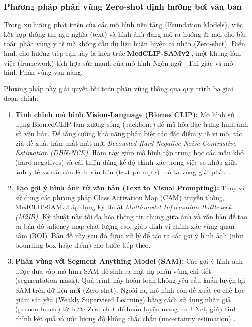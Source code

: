\subsubsection{Phương pháp phân vùng Zero-shot định hướng bởi văn bản}
Trong xu hướng phát triển của các mô hình nền tảng (Foundation Models), việc kết hợp thông tin ngữ nghĩa (text) và hình ảnh đang mở ra hướng đi mới cho bài toán phân vùng y tế mà không cần dữ liệu huấn luyện có nhãn (Zero-shot). Điển hình cho hướng tiếp cận này là kiến trúc \textbf{MedCLIP-SAMv2} \cite{koleilat2025medclipsamv2}, một khung làm việc (framework) tích hợp sức mạnh của mô hình Ngôn ngữ - Thị giác và mô hình Phân vùng vạn năng.

Phương pháp này giải quyết bài toán phân vùng thông qua quy trình ba giai đoạn chính:

\begin{enumerate}
    \item \textbf{Tinh chỉnh mô hình Vision-Language (BiomedCLIP):} 
    Mô hình sử dụng BiomedCLIP làm xương sống (backbone) để mã hóa đặc trưng hình ảnh và văn bản. Để tăng cường khả năng phân biệt các đặc điểm y tế vi mô, tác giả đề xuất hàm mất mát mới \textit{Decoupled Hard Negative Noise Contrastive Estimation (DHN-NCE)}. Hàm này giúp mô hình tập trung học các mẫu khó (hard negatives) và cải thiện đáng kể độ chính xác trong việc so khớp giữa ảnh y tế và các câu lệnh văn bản (text prompts) mô tả vùng giải phẫu \cite{koleilat2025medclipsamv2}.

    \item \textbf{Tạo gợi ý hình ảnh từ văn bản (Text-to-Visual Prompting):} 
    Thay vì sử dụng các phương pháp Class Activation Map (CAM) truyền thống, MedCLIP-SAMv2 áp dụng kỹ thuật \textit{Multi-modal Information Bottleneck (M2IB)}. Kỹ thuật này tối đa hóa thông tin chung giữa ảnh và văn bản để tạo ra bản đồ saliency map chất lượng cao, giúp định vị chính xác vùng quan tâm (ROI). Bản đồ này sau đó được xử lý để tạo ra các gợi ý hình ảnh (như bounding box hoặc điểm) cho bước tiếp theo.

    \item \textbf{Phân vùng với Segment Anything Model (SAM):} 
    Các gợi ý hình ảnh được đưa vào mô hình SAM để sinh ra mặt nạ phân vùng chi tiết (segmentation mask). Quá trình này hoàn toàn không yêu cầu huấn luyện lại SAM trên dữ liệu mới (Zero-shot). Ngoài ra, mô hình còn đề xuất cơ chế học giám sát yếu (Weakly Supervised Learning) bằng cách sử dụng nhãn giả (pseudo-labels) từ bước Zero-shot để huấn luyện mạng nnU-Net, giúp tinh chỉnh kết quả và ước lượng độ không chắc chắn (uncertainty estimation) \cite{koleilat2025medclipsamv2}.
\end{enumerate}

